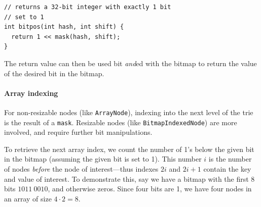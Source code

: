 \documentclass[preprint]{sigplanconf}
\begin{document}
\begin{verbatim}
// returns a 32-bit integer with exactly 1 bit 
// set to 1
int bitpos(int hash, int shift) {
  return 1 << mask(hash, shift);
}
\end{verbatim}


The return value can then 
be used bit \textit{and}ed
with the bitmap to return the value of the
desired bit in the bitmap.

\paragraph{Array indexing}

For non-resizable nodes (like \texttt{ArrayNode}),
indexing into the next level of the trie
is the result of a \texttt{mask}.
Resizable nodes (like \texttt{BitmapIndexedNode})
are more involved,
and require further bit manipulations.

To retrieve the next array index, we count the number of 1's
below the given bit in the bitmap (assuming the given
bit is set to 1).
This number $i$ is the number of nodes \textit{before}
the node of interest---thus indexes $2i$ and $2i+1$
contain the key and value of interest.
To demonstrate this, say we have a bitmap
with the first 8 bits $1011\ 0010$, and
otherwise zeros.
Since four bits are 1, we have four nodes
in an array of size $4\cdot2=8$.


\end{document}
